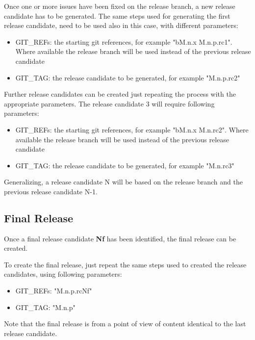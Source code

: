 Once one or more issues have been fixed on the release branch, a new release candidate has to be generated. %
The same steps used for generating the first release candidate, need to be used also in this case, with different parameters:

\begin{itemize}
\item GIT\_REFs: the starting git references, for example "bM.n.x M.n.p.rc1". Where available the release branch will be used instead of the previous release candidate
\item GIT\_TAG: the release candidate to be generated, for example "M.n.p.rc2"
\end{itemize}

Further release candidates can be created just repeating the process with the appropriate parameters.
The release candidate 3 will require following parameters:

\begin{itemize}
\item GIT\_REFs: the starting git references, for example "bM.n.x M.n.rc2". Where available the release branch will be used instead of the previous release candidate
\item GIT\_TAG: the release candidate to be generated, for example "M.n.rc3"
\end{itemize}

Generalizing, a release candidate N will be based on the release branch and the previous release candidate N-1.
 

\subsection{Final Release} \label{sec:finalrelease}

Once a final release candidate {\bf Nf} has been identified, the final release can be created.

To create the final release, just repeat the same steps used to created the release candidates, using following parameters:

\begin{itemize}
\item GIT\_REFs: "M.n.p.rcNf"
\item GIT\_TAG: "M.n.p"
\end{itemize}

Note that the final release is from a point of view of content identical to the last release candidate.

